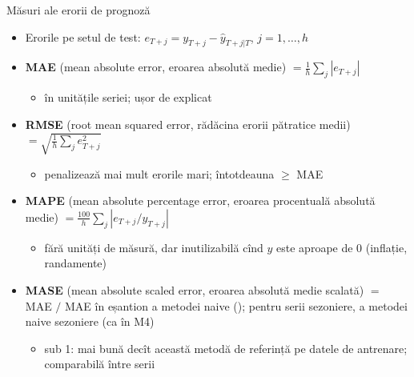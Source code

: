 \begin{frame}{Măsuri ale erorii de prognoză}
\itemsize{\footnotesize}
\begin{itemize}
    \item Erorile pe setul de test: $e_{T+j} = y_{T+j} - \hat y_{T+j|T}$, $j = 1, \ldots, h$
    \item \textbf{MAE} (mean absolute error, eroarea absolută medie) $= \frac1h \sum_j |e_{T+j}|$
    \begin{itemize}
        \item în unitățile seriei; ușor de explicat
    \end{itemize}
    \item \textbf{RMSE} (root mean squared error, rădăcina erorii pătratice medii) $= \sqrt{\frac1h \sum_j e_{T+j}^2}$
    \begin{itemize}
        \item penalizează mai mult erorile mari; întotdeauna $\ge$ MAE
    \end{itemize}
    \item \textbf{MAPE} (mean absolute percentage error, eroarea procentuală absolută medie) $= \frac{100}{h} \sum_j |e_{T+j} / y_{T+j}|$
    \begin{itemize}
        \item fără unități de măsură, dar inutilizabilă cînd $y$ este aproape de 0 (inflație, randamente)
    \end{itemize}
    \item \textbf{MASE} (mean absolute scaled error, eroarea absolută medie scalată) $=$ MAE $/$ MAE în eșantion a metodei naive (); pentru serii sezoniere, a metodei naive sezoniere (ca în M4)
    \begin{itemize}
        \item sub 1: mai bună decît această metodă de referință pe datele de antrenare; comparabilă între serii
    \end{itemize}
\end{itemize}
\end{frame}

